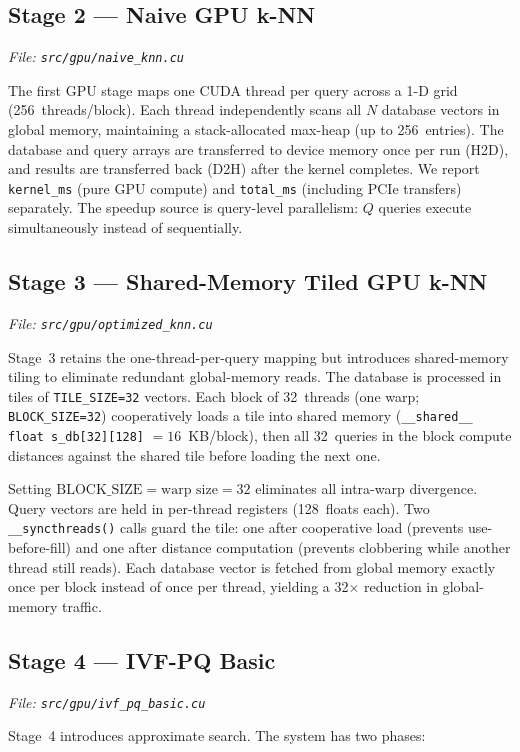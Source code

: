 \documentclass[12pt]{article}
\newcommand{\code}[1]{\texttt{\small #1}}
\begin{document}
\subsection{Stage 2 --- Naive GPU k-NN}
\textit{File: \code{src/gpu/naive\_knn.cu}}

The first GPU stage maps one CUDA thread per query across a 1-D grid
(256~threads/block). Each thread independently scans all $N$ database vectors
in global memory, maintaining a stack-allocated max-heap (up to 256~entries).
The database and query arrays are transferred to device memory once per run
(H2D), and results are transferred back (D2H) after the kernel completes.
We report \code{kernel\_ms} (pure GPU compute) and \code{total\_ms}
(including PCIe transfers) separately.
The speedup source is query-level parallelism: $Q$ queries execute simultaneously
instead of sequentially.

\subsection{Stage 3 --- Shared-Memory Tiled GPU k-NN}
\textit{File: \code{src/gpu/optimized\_knn.cu}}

Stage~3 retains the one-thread-per-query mapping but introduces shared-memory
tiling to eliminate redundant global-memory reads.
The database is processed in tiles of \code{TILE\_SIZE=32} vectors.
Each block of 32~threads (one warp; \code{BLOCK\_SIZE=32}) cooperatively loads a
tile into shared memory
(\code{\_\_shared\_\_ float s\_db[32][128]} $= 16$~KB/block),
then all 32~queries in the block compute distances against the shared tile
before loading the next one.

Setting $\text{BLOCK\_SIZE} = \text{warp size} = 32$ eliminates all intra-warp
divergence. Query vectors are held in per-thread registers (128~floats each).
Two \code{\_\_syncthreads()} calls guard the tile: one after cooperative load
(prevents use-before-fill) and one after distance computation (prevents
clobbering while another thread still reads).
Each database vector is fetched from global memory exactly once per block
instead of once per thread, yielding a 32$\times$ reduction in global-memory
traffic.

\subsection{Stage 4 --- IVF-PQ Basic}
\textit{File: \code{src/gpu/ivf\_pq\_basic.cu}}

Stage~4 introduces approximate search. The system has two phases:
\end{document}
